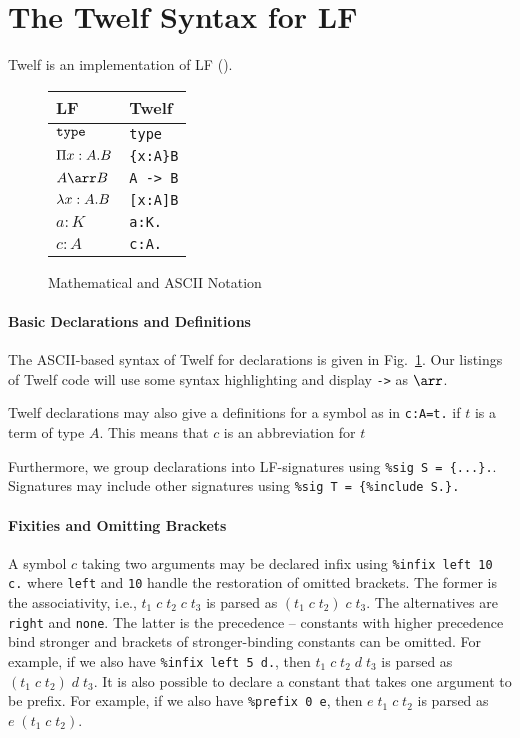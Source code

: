 \section{The Twelf Syntax for LF}

Twelf is an implementation of LF (\cite{twelf}).


\begin{figure}[ht]
\begin{center}
\begin{tabular}{|l|l|}
\hline
LF & Twelf \\
\hline
$\TYPE$       & \verb|type|\\
$\P{x}{A}B$   & \verb|{x:A}B|\\
$A\arr B$     & \verb|A -> B|\\
$\lam{x}{A}B$ & \verb|[x:A]B|\\
$a:K$         & \verb|a:K.|\\
$c:A$         & \verb|c:A.|\\
\hline
\end{tabular}
\end{center}
\caption{Mathematical and ASCII Notation}\label{fig:lftwelfsyntax}
\end{figure}

\paragraph{Basic Declarations and Definitions}
The ASCII-based syntax of Twelf for declarations is given in Fig.~\ref{fig:lftwelfsyntax}.
Our listings of Twelf code will use some syntax highlighting and display \verb|->| as $\arr$.

Twelf declarations may also give a definitions for a symbol as in \verb|c:A=t.| if $t$ is a term of type $A$. This means that $c$ is an abbreviation for $t$

Furthermore, we group declarations into LF-signatures using \verb|%sig S = {...}.|. Signatures may include other signatures using \verb|%sig T = {%include S.}.|

\paragraph{Fixities and Omitting Brackets}
A symbol $c$ taking two arguments may be declared infix using \verb|%infix left 10 c.| where \verb|left| and \verb|10| handle the restoration of omitted brackets. The former is the associativity, i.e., $t_1\;c\;t_2\;c\;t_3$ is parsed as $(t_1\;c\;t_2)\;c\;t_3$. The alternatives are \verb|right| and \verb|none|. The latter is the precedence -- constants with higher precedence bind stronger and brackets of stronger-binding constants can be omitted. For example, if we also have \verb|%infix left 5 d.|, then $t_1\;c\;t_2\;d\;t_3$ is parsed as $(t_1\;c\;t_2)\;d\;t_3$. It is also possible to declare a constant that takes one argument to be prefix. For example, if we also have \verb|%prefix 0 e|, then $e\;t_1\;c\;t_2$ is parsed as $e\;(t_1\;c\;t_2)$.

